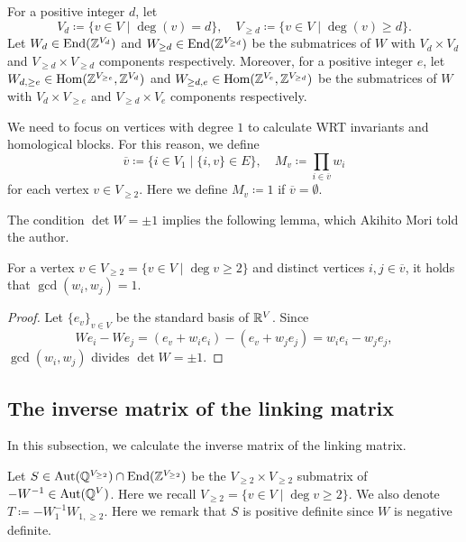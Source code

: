 \documentclass[11pt,a4paper,lualatex]{amsart}
\numberwithin{equation}{section} %
\begin{document}
For a positive integer $ d $, let
\[
V_d \coloneqq \{ v \in V \mid \deg(v) = d \}, \quad
V_{\ge d} \coloneqq \{ v \in V \mid \deg(v) \ge d \}.
\]
Let $ W_d \in \operatorname{End}(\mathbb{Z}^{V_d}) $ and $ W_{\ge d} \in \operatorname{End}(\mathbb{Z}^{V_{\ge d}}) $ be the submatrices of $ W $ with $ V_d \times V_d $ and $ V_{\ge d} \times V_{\ge d} $ components respectively.
Moreover, for a positive integer $ e $, let $ W_{d, \ge e} \in \operatorname{Hom}(\mathbb{Z}^{V_{\ge e}}, \mathbb{Z}^{V_d}) $ and $ W_{\ge d, e} \in  \operatorname{Hom}(\mathbb{Z}^{V_e}, \mathbb{Z}^{V_{\ge d}}) $ be the submatrices of $ W $ with $ V_d \times V_{\ge e} $ and $ V_{\ge d} \times V_e $ components respectively.

We need to focus on vertices with degree $ 1 $ to calculate WRT invariants and homological blocks.
For this reason, we define 
\[
\overline{v} \coloneqq \{ i \in V_1 \mid \{ i, v \} \in E \}, \quad
M_v \coloneqq \prod_{i \in \overline{v}} w_i
\]
for each vertex $ v \in V_{\ge 2} $.
Here we define $ M_v \coloneqq 1 $ if $ \overline{v} = \emptyset $.

The condition $ \det W = \pm 1 $ implies the following lemma, which Akihito Mori told the author.

\begin{lem} \label{lem:coprime}
	For a vertex $ v \in V_{\ge 2} = \{ v \in V \mid \deg v \ge 2 \} $ and distinct vertices $ i, j \in \overline{v} $, it holds that $ \gcd(w_i, w_j) = 1 $.
\end{lem}

\begin{proof}
	Let $ \{ e_{v} \}_{v \in V} $ be the standard basis of $ \mathbb{R}^V $.
	Since 
	\[
	W e_i - W e_j 
	=
	(e_{v} + w_i e_i) - (e_{v} + w_j e_j)
	=
	w_i e_i - w_j e_j,
	\]
	$ \gcd(w_i, w_j) $ divides $ \det W = \pm 1 $.
\end{proof}


\subsection{The inverse matrix of the linking matrix} \label{subsec:S}


In this subsection, we calculate the inverse matrix of the linking matrix.

Let $ S \in \operatorname{Aut}(\mathbb{Q}^{V_{\ge 2}}) \cap \operatorname{End}(\mathbb{Z}^{V_{\ge 2}}) $ be the $ V_{\ge 2} \times V_{\ge 2} $ submatrix of $ -W^{-1} \in \operatorname{Aut}(\mathbb{Q}^V) $.
Here we recall $ V_{\ge 2} = \{ v \in V \mid \deg v \ge 2 \} $.
We also denote $ T \coloneqq  -W_1^{-1} W_{1, \ge 2} $. 
Here we remark that $ S $ is positive definite since $ W $ is negative definite.
\end{document}
